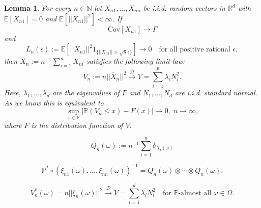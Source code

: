 \documentclass[10pt,a4paper]{amsart}
\newtheorem{lemma}{Lemma}
\begin{document}
\begin{lemma} \label{convVn} For every $n \in \mathbb{N}$ let $X_{n1},\ldots,X_{nn}$ be i.i.d. random vectors in $\mathbb{R}^d$ with
$\mathbb{E}[X_{n1}]=0$ and $\mathbb{E}[||X_{n1}||^2]< \infty$. If
\begin{equation}
 \text{Cov}[X_{n1}] \rightarrow \Gamma
\end{equation}
and
\begin{equation} \label{Lindebergconditionwithrationals}
 L_n(\epsilon) := \mathbb{E}[||X_{n1}||^2 1_{\{||X_{n1}||> \sqrt{n} \epsilon\}}] \rightarrow 0 \quad \text{for all positive rational }  \epsilon,
\end{equation}
then $\overline{X}_n := n^{-1} \sum_{i=1}^n X_{ni}$ satisfies the following limit-law:
$$
 V_n:= n ||\overline{X}_n||^2 \stackrel{\mathcal{D}}{\rightarrow} V=\sum_{i=1}^p \lambda_i N_i^2.
$$
Here, $\lambda_1,\dots,\lambda_d$ are the eigenvalues of $\Gamma$ and $N_1,\ldots,N_d$ are i.i.d. standard normal. As we know
this is equivalent to
$$
  \sup_{x \in \mathbb{R}}|\mathbb{P}(V_n \le x)-F(x)| \rightarrow 0, \;  n \rightarrow \infty,
$$
where $F$ is the distribution function of $V$.
\end{lemma}

\begin{equation} \label{defQn}
 Q_n(\omega):= n^{-1} \sum_{i=1}^n \delta_{X_i(\omega)}
\end{equation}

\begin{equation} \label{distribbootstrap}
\mathbb{P}^*\circ (\xi_{n1}(\omega),\ldots,\xi_{nn}(\omega))^{-1}=Q_n(\omega)\otimes \cdots \otimes Q_n(\omega).
\end{equation}

\begin{equation} \label{bootstrapconv}
 V_n^*(\omega)= n ||\overline{\xi}_n(\omega)||^2 \stackrel{\mathcal{D}}{\rightarrow} V=\sum_{i=1}^d \lambda_i N_i^2 \quad \text{for } \mathbb{P}\text{-almost all } \omega \in \Omega.
\end{equation}
\end{document}
